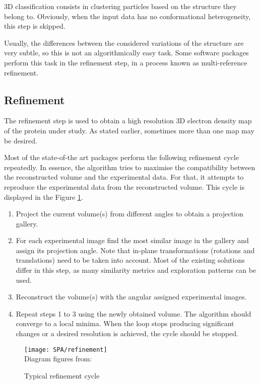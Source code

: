 \documentclass[../main.tex]{subfiles}
\begin{document}
3D classification consists in clustering particles based on the structure they belong to. Obviously, when the input data has no conformational heterogeneity, this step is skipped.

Usually, the differences between the considered variations of the structure are very subtle, so this is not an algorithmically easy task. Some software packages perform this task in the refinement step, in a process known as multi-reference refinement.

\subsection{Refinement}
The refinement step is used to obtain a high resolution 3D electron density map of the protein under study. As stated earlier, sometimes more than one map may be desired. 

Most of the state-of-the art packages perform the following refinement cycle repeatedly. In essence, the algorithm tries to maximise the compatibility between the reconstructed volume and the experimental data. For that, it attempts to reproduce the experimental data from the reconstructed volume. This cycle is displayed in the Figure \ref{fig:2:refinement}.

\begin{enumerate}
    \item Project the current volume(s) from different angles to obtain a projection gallery.
    \item For each experimental image find the most similar image in the gallery and assign its projection angle. Note that in-plane transformations (rotations and translations) need to be taken into account. Most of the existing solutions differ in this step, as many similarity metrics and exploration patterns can be used.
    \item Reconstruct the volume(s) with the angular assigned experimental images.
    \item Repeat steps 1 to 3 using the newly obtained volume. The algorithm should converge to a local minima\cite{sigworth2015}. When the loop stops producing significant changes or a desired resolution is achieved, the cycle should be stopped.
\end{enumerate}

\begin{figure}[htbp]
    \centering
    \texttt{[image: SPA/refinement]}\\
    Diagram figures from: \cite{nogales2015}
    \caption{Typical refinement cycle}
    \label{fig:2:refinement}
\end{figure}
\end{document}
